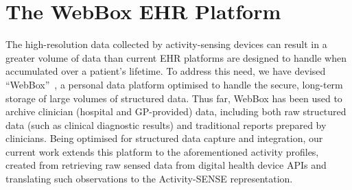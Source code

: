 \documentclass{chi-ext}
\begin{document}
\section{The WebBox EHR Platform}

The high-resolution data collected by activity-sensing devices can result in a greater volume of data than current EHR platforms are designed to handle when  accumulated over a patient's lifetime. To address this need, we have devised  ``WebBox''~\cite{webbox}, a personal data platform optimised to handle the secure, long-term storage of large volumes of structured data.  Thus far, WebBox has been used to archive clinician (hospital and GP-provided) data, including both raw structured data (such as clinical diagnostic results) and traditional reports prepared by clinicians.  Being optimised for structured data capture and integration, our current work extends this platform to the aforementioned activity profiles, created from retrieving raw sensed data from digital health device APIs and translating such observations to the Activity-SENSE representation.  






\end{document}
